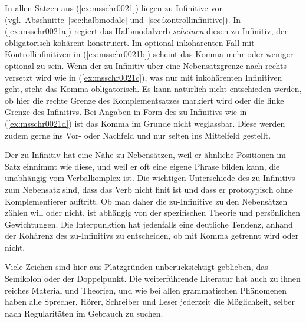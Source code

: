 In allen Sätzen aus (\ref{ex:msschr0021}) liegen zu-Infinitive vor (vgl.\ Abschnitte~\ref{sec:halbmodale} und~\ref{sec:kontrollinfinitive}).
In (\ref{ex:msschr0021a}) regiert das Halbmodalverb \textit{scheinen} diesen zu-Infinitiv, der obligatorisch kohärent konstruiert.
Im optional inkohärenten Fall mit Kontrollinfinitiven in (\ref{ex:msschr0021b}) scheint das Komma mehr oder weniger optional zu sein.
Wenn der zu-Infinitiv über eine Nebensatzgrenze nach rechts versetzt wird wie in (\ref{ex:msschr0021c}), was nur mit inkohärenten Infinitiven geht, steht das Komma obligatorisch.
Es kann natürlich nicht entschieden werden, ob hier die rechte Grenze des Komplementsatzes markiert wird oder die linke Grenze des Infinitivs.
Bei Angaben in Form des zu-Infinitivs wie in (\ref{ex:msschr0021d}) ist das Komma im Grunde nicht weglassbar.
Diese werden zudem gerne ins Vor- oder Nachfeld und nur selten ins Mittelfeld gestellt.

Der zu-Infinitiv hat eine Nähe zu Nebensätzen, weil er ähnliche Positionen im Satz einnimmt wie diese, und weil er oft eine eigene Phrase bilden kann, die unabhängig vom Verbalkomplex ist.
Die wichtigen Unterschiede des zu-Infinitivs zum Nebensatz sind, dass das Verb nicht finit ist und dass er prototypisch ohne Komplementierer auftritt.
Ob man daher die zu-Infinitive zu den Nebensätzen zählen will oder nicht, ist abhängig von der spezifischen Theorie und persönlichen Gewichtungen.
Die Interpunktion hat jedenfalls eine deutliche Tendenz, anhand der Kohärenz des zu-Infinitivs zu entscheiden, ob mit Komma getrennt wird oder nicht.

Viele Zeichen sind hier aus Platzgründen unberücksichtigt geblieben, \zB das Semikolon oder der Doppelpunkt.
Die weiterführende Literatur hat auch zu ihnen reiches Material und Theorien, und wie bei allen grammatischen Phänomenen haben alle Sprecher, Hörer, Schreiber und Leser jederzeit die Möglichkeit, selber nach Regularitäten im Gebrauch zu suchen.

\Zusammenfassung

